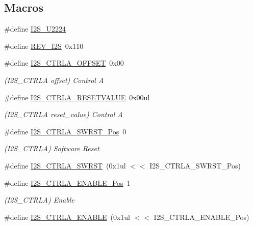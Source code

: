 \subsection*{Macros}
\begin{DoxyCompactItemize}
\item 
\#define \mbox{\hyperlink{group___s_a_m_d21___i2_s_ga1b77184c9cb24174a046ad3780533506}{I2\+S\+\_\+\+U2224}}
\item 
\#define \mbox{\hyperlink{group___s_a_m_d21___i2_s_gab3cc351208f2a37adb18d25a1608295e}{R\+E\+V\+\_\+\+I2S}}~0x110
\item 
\#define \mbox{\hyperlink{group___s_a_m_d21___i2_s_ga6d620cfa3bc2af7bdbbbae9252f5b567}{I2\+S\+\_\+\+C\+T\+R\+L\+A\+\_\+\+O\+F\+F\+S\+ET}}~0x00
\begin{DoxyCompactList}\small\item\em (I2\+S\+\_\+\+C\+T\+R\+LA offset) Control A \end{DoxyCompactList}\item 
\#define \mbox{\hyperlink{group___s_a_m_d21___i2_s_gac55724eab173039ae6acf553ed92c693}{I2\+S\+\_\+\+C\+T\+R\+L\+A\+\_\+\+R\+E\+S\+E\+T\+V\+A\+L\+UE}}~0x00ul
\begin{DoxyCompactList}\small\item\em (I2\+S\+\_\+\+C\+T\+R\+LA reset\+\_\+value) Control A \end{DoxyCompactList}\item 
\#define \mbox{\hyperlink{group___s_a_m_d21___i2_s_ga397b6ac745baf60099bd267adf4143a8}{I2\+S\+\_\+\+C\+T\+R\+L\+A\+\_\+\+S\+W\+R\+S\+T\+\_\+\+Pos}}~0
\begin{DoxyCompactList}\small\item\em (I2\+S\+\_\+\+C\+T\+R\+LA) Software Reset \end{DoxyCompactList}\item 
\#define \mbox{\hyperlink{group___s_a_m_d21___i2_s_gaed039b9c7a91d09469b5f86b1b44d0c2}{I2\+S\+\_\+\+C\+T\+R\+L\+A\+\_\+\+S\+W\+R\+ST}}~(0x1ul $<$$<$ I2\+S\+\_\+\+C\+T\+R\+L\+A\+\_\+\+S\+W\+R\+S\+T\+\_\+\+Pos)
\item 
\#define \mbox{\hyperlink{group___s_a_m_d21___i2_s_ga3eca624a3bbc9c500de9624a3c816399}{I2\+S\+\_\+\+C\+T\+R\+L\+A\+\_\+\+E\+N\+A\+B\+L\+E\+\_\+\+Pos}}~1
\begin{DoxyCompactList}\small\item\em (I2\+S\+\_\+\+C\+T\+R\+LA) Enable \end{DoxyCompactList}\item 
\#define \mbox{\hyperlink{group___s_a_m_d21___i2_s_gacf2dacb0aa6f00d2f1115c42384788c7}{I2\+S\+\_\+\+C\+T\+R\+L\+A\+\_\+\+E\+N\+A\+B\+LE}}~(0x1ul $<$$<$ I2\+S\+\_\+\+C\+T\+R\+L\+A\+\_\+\+E\+N\+A\+B\+L\+E\+\_\+\+Pos)

\end{DoxyCompactItemize}

